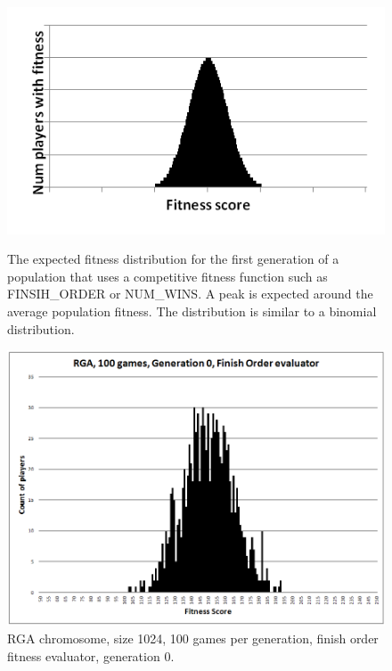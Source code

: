 \begin{figure}
\centering
\begin{minipage}[t]{0.47\linewidth}
\centering
\includegraphics[width=1.0\linewidth]{Figures/binomial.png}
\caption[Binomial Distribution]{The expected fitness distribution for the first
generation of a population that uses a competitive fitness function such as
FINSIH\_ORDER or NUM\_WINS. A peak is expected around the average population
fitness. The distribution is similar to a binomial distribution.}
\label{figure-binomial}
\end{minipage}%
\hspace{0.06\linewidth}%
\begin{minipage}[t]{0.47\linewidth}
\centering
\includegraphics[width=1.0\linewidth]{Figures/RGA_1024_G000_N100_FO.png}
\caption[RGA Finish Order Fitness Distribution, Initial Generation]{RGA
chromosome, size 1024, 100 games per generation, finish order
fitness evaluator, generation 0.}
\label{figure-RGA-G000-N100-FO-initial_fitness}
\end{minipage}
\end{figure}

